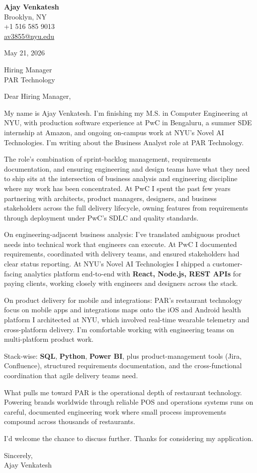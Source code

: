 \documentclass[letterpaper,11pt]{article}
\begin{document}
\begin{flushleft}
\textbf{\large Ajay Venkatesh} \\
Brooklyn, NY \\
+1 516 585 9013 \\
\href{mailto:av3855@nyu.edu}{av3855@nyu.edu}
\end{flushleft}
\vspace{10pt}
May 21, 2026
\vspace{6pt}

Hiring Manager \\
PAR Technology

\vspace{10pt}

Dear Hiring Manager,

My name is Ajay Venkatesh. I'm finishing my M.S. in Computer Engineering at NYU, with production software experience at PwC in Bengaluru, a summer SDE internship at Amazon, and ongoing on-campus work at NYU's Novel AI Technologies. I'm writing about the Business Analyst role at PAR Technology.

The role's combination of sprint-backlog management, requirements documentation, and ensuring engineering and design teams have what they need to ship sits at the intersection of business analysis and engineering discipline where my work has been concentrated. At PwC I spent the past few years partnering with architects, product managers, designers, and business stakeholders across the full delivery lifecycle, owning features from requirements through deployment under PwC's SDLC and quality standards.

On engineering-adjacent business analysis: I've translated ambiguous product needs into technical work that engineers can execute. At PwC I documented requirements, coordinated with delivery teams, and ensured stakeholders had clear status reporting. At NYU's Novel AI Technologies I shipped a customer-facing analytics platform end-to-end with \textbf{React, Node.js, REST APIs} for paying clients, working closely with engineers and designers across the stack.

On product delivery for mobile and integrations: PAR's restaurant technology focus on mobile apps and integrations maps onto the iOS and Android health platform I architected at NYU, which involved real-time wearable telemetry and cross-platform delivery. I'm comfortable working with engineering teams on multi-platform product work.

Stack-wise: \textbf{SQL}, \textbf{Python}, \textbf{Power BI}, plus product-management tools (Jira, Confluence), structured requirements documentation, and the cross-functional coordination that agile delivery teams need.

What pulls me toward PAR is the operational depth of restaurant technology. Powering brands worldwide through reliable POS and operations systems runs on careful, documented engineering work where small process improvements compound across thousands of restaurants.

I'd welcome the chance to discuss further. Thanks for considering my application.

\vspace{12pt}
Sincerely, \\
Ajay Venkatesh
\end{document}
